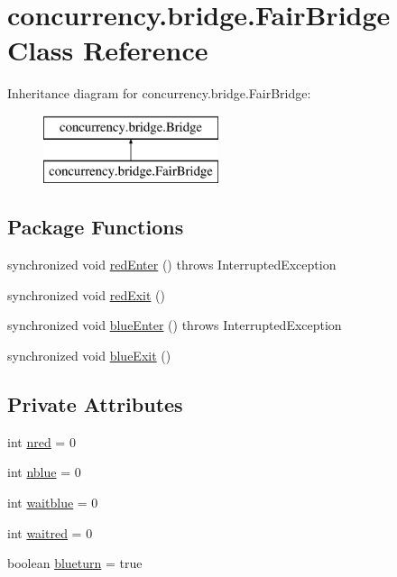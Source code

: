 \hypertarget{classconcurrency_1_1bridge_1_1_fair_bridge}{}\section{concurrency.\+bridge.\+Fair\+Bridge Class Reference}
\label{classconcurrency_1_1bridge_1_1_fair_bridge}
Inheritance diagram for concurrency.\+bridge.\+Fair\+Bridge\+:\begin{figure}[H]
\begin{center}
\leavevmode
\includegraphics[height=2.000000cm]{classconcurrency_1_1bridge_1_1_fair_bridge}
\end{center}
\end{figure}
\subsection*{Package Functions}
\begin{DoxyCompactItemize}
\item 
synchronized void \mbox{\hyperlink{classconcurrency_1_1bridge_1_1_fair_bridge_a0bc08559b555b45c637225bbee618acb}{red\+Enter}} ()  throws Interrupted\+Exception 
\item 
synchronized void \mbox{\hyperlink{classconcurrency_1_1bridge_1_1_fair_bridge_a8d49faeac4442f9a94aa7ee02131674e}{red\+Exit}} ()
\item 
synchronized void \mbox{\hyperlink{classconcurrency_1_1bridge_1_1_fair_bridge_a22e1d98bdcc46acd8750191b04e78a0a}{blue\+Enter}} ()  throws Interrupted\+Exception 
\item 
synchronized void \mbox{\hyperlink{classconcurrency_1_1bridge_1_1_fair_bridge_a1414fdd64a79f47dbb4aa384b3d3041f}{blue\+Exit}} ()
\end{DoxyCompactItemize}
\subsection*{Private Attributes}
\begin{DoxyCompactItemize}
\item 
int \mbox{\hyperlink{classconcurrency_1_1bridge_1_1_fair_bridge_a858202569a7a17b2a613da82f56ce92a}{nred}} = 0
\item 
int \mbox{\hyperlink{classconcurrency_1_1bridge_1_1_fair_bridge_a5af7f149ac3d495f24119357e9b52263}{nblue}} = 0
\item 
int \mbox{\hyperlink{classconcurrency_1_1bridge_1_1_fair_bridge_a22597d8af11fb8d6799568ab8529b7db}{waitblue}} = 0
\item 
int \mbox{\hyperlink{classconcurrency_1_1bridge_1_1_fair_bridge_a8bb19943210b667898db6e363072741a}{waitred}} = 0
\item 
boolean \mbox{\hyperlink{classconcurrency_1_1bridge_1_1_fair_bridge_ab83efd0c4e3b7e9b16f57361e6f4826b}{blueturn}} = true
\end{DoxyCompactItemize}


